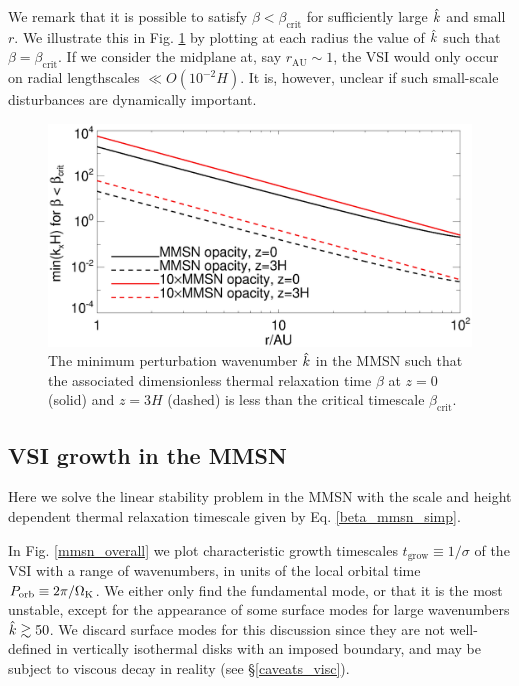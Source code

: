 
We remark that it is possible to satisfy $\beta < \beta_\mathrm{crit}$
for sufficiently large $\hat{k}$ and small $r$. We illustrate this in 
Fig. \ref{mmsn_bcrit_bcool_mink} by plotting at each radius the value
of $\hat{k}$ such that $\beta = \beta_\mathrm{crit}$. If we consider the
midplane at, say $r_\mathrm{AU}\sim 1$, the VSI would only occur on 
radial lengthscales $\ll O(10^{-2}H)$. It is, however, unclear if such
small-scale disturbances are dynamically important.  


\begin{figure}
  \includegraphics[width=\linewidth]{figures/bcrit_mink} 
  \caption{The minimum perturbation wavenumber $\hat{k}$ in
    the MMSN such that the associated dimensionless thermal
    relaxation time $\beta$ at $z=0$ (solid) and $z=3H$ (dashed) is
    less than the critical timescale $\beta_\mathrm{crit}$.   
    \label{mmsn_bcrit_bcool_mink}}   
\end{figure}  

\subsection{VSI growth in the MMSN}\label{vsi_mmsn_grow}
Here we solve the linear stability problem in the MMSN with the scale and
height dependent thermal relaxation timescale given by
Eq. \ref{beta_mmsn_simp}. 

In Fig. \ref{mmsn_overall} we plot characteristic growth timescales
$t_\mathrm{grow} \equiv 1/\sigma$ of the VSI with a range of
wavenumbers, in units of the local orbital time $P_\mathrm{orb}\equiv
2\pi/\Omega_{\rm K}$. We either only find the fundamental mode, or 
that it is the most unstable, except for the appearance of some 
surface modes for large wavenumbers $\hat{k}\gtrsim 50$. We discard
surface modes for this discussion since they are not well-defined 
in vertically isothermal disks with an imposed boundary,
 and may be subject to viscous decay in reality
(see \S\ref{caveats_visc}).   

